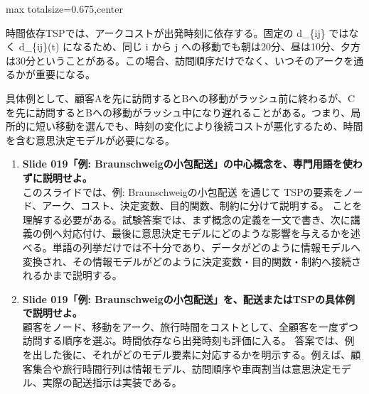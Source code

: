 \begin{adjustbox}{max totalsize={\textwidth}{0.675\textheight},center}
\begin{minipage}{\textwidth}
\begin{minipage}[t]{0.485\textwidth}
時間依存TSPでは、アークコストが出発時刻に依存する。固定の d\_\{ij\} ではなく d\_\{ij\}(t) になるため、同じ i から j への移動でも朝は20分、昼は10分、夕方は30分ということがある。この場合、訪問順序だけでなく、いつそのアークを通るかが重要になる。\par
具体例として、顧客Aを先に訪問するとBへの移動がラッシュ前に終わるが、Cを先に訪問するとBへの移動がラッシュ中になり遅れることがある。つまり、局所的に短い移動を選んでも、時刻の変化により後続コストが悪化するため、時間を含む意思決定モデルが必要になる。\par
{}
\begin{enumerate}
\item \textbf{Slide 019「例: Braunschweigの小包配送」の中心概念を、専門用語を使わずに説明せよ。}\\このスライドでは、例: Braunschweigの小包配送 を通じて TSPの要素をノード、アーク、コスト、決定変数、目的関数、制約に分けて説明する。 ことを理解する必要がある。試験答案では、まず概念の定義を一文で書き、次に講義の例へ対応付け、最後に意思決定モデルにどのような影響を与えるかを述べる。単語の列挙だけでは不十分であり、データがどのように情報モデルへ変換され、その情報モデルがどのように決定変数・目的関数・制約へ接続されるかまで説明する。
\item \textbf{Slide 019「例: Braunschweigの小包配送」を、配送またはTSPの具体例で説明せよ。}\\顧客をノード、移動をアーク、旅行時間をコストとして、全顧客を一度ずつ訪問する順序を選ぶ。時間依存なら出発時刻も評価に入る。 答案では、例を出した後に、それがどのモデル要素に対応するかを明示する。例えば、顧客集合や旅行時間行列は情報モデル、訪問順序や車両割当は意思決定モデル、実際の配送指示は実装である。
\end{enumerate}
\end{minipage}
\end{minipage}
\end{adjustbox}

